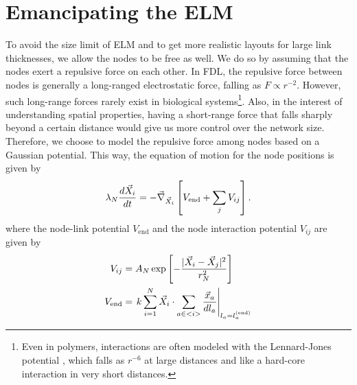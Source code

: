 \documentclass[nofootinbib,preprint,floatfix]{revtex4} %
\begin{document}
\section{Emancipating the ELM}
To avoid the size limit of ELM and to get more realistic layouts for large link thicknesses,
we allow the nodes to be free as well. 
We do so by assuming that the nodes exert a repulsive force on each other.  
In FDL, the repulsive force between nodes is generally a long-ranged electrostatic force, falling as $F \propto r^{-2}$. 
However, such long-range forces rarely exist in biological systems\footnote{Even in polymers, interactions are often modeled with the Lennard-Jones potential \cite{lennard1924determination}, which falls as $r^{-6}$ at large distances and like a hard-core interaction in very short distances. }.
Also, in the interest of understanding spatial properties, having a short-range %
force that falls sharply beyond a certain distance %
would give us more control over the network size. Therefore, we choose to model the repulsive force among nodes based on a Gaussian potential. %
This way, the equation of motion for the node positions is given by
\begin{equation}
    \lambda_N {d\vec{X}_i\over dt} = - \vec{\nabla}_{\vec{X}_i} \left[V_{\mathrm{end}} + \sum_j V_{ij} \right]. \label{eq:nodes}
\end{equation}
where the node-link potential $V_{\mathrm{end}}$ and the node interaction potential $V_{ij}$ are given by 
\begin{align}
    V_{ij} &= %
A_N \exp\left[- {|\vec{X}_i-\vec{X}_j|^2 \over r_N^2}\right]\label{eq:VIJ}\\
 V_{\mathrm{end}} & =\left. k\sum_{i=1}^N \vec{X}_i \cdot \sum_{a\in <i>}  {\vec{x}_a%
 \over dl_a}\right|_{l_a = l^{(\mathrm{end})}_a}
\end{align}
\end{document}
